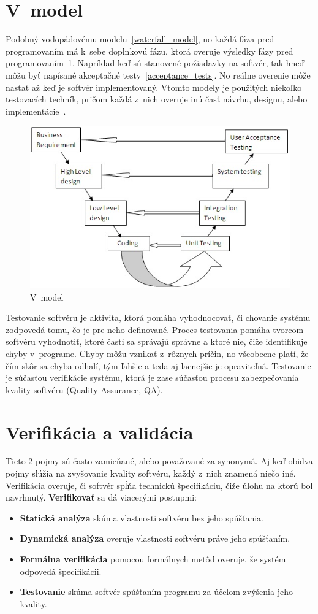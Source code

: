 \section*{V~model}
\label{v_model}
Podobný vodopádovému modelu~\ref{waterfall_model}, no každá fáza pred programovaním má k~sebe doplnkovú fázu, ktorá overuje výsledky fázy pred programovaním~\ref{v_model_fig}.
Napríklad keď sú stanovené požiadavky na softvér, tak hneď môžu byť napísané akceptačné testy~\ref{acceptance_tests}.
No reálne overenie môže nastať až keď je softvér implementovaný.
Vtomto modely je použitých niekoľko testovacích techník, pričom každá z~nich overuje inú časť návrhu, designu, alebo implementácie~\cite{Patton}.
\begin{figure}[H]
\centering
\includegraphics[width=0.65\linewidth]{obrazky/v_model.png}
\caption{V~model~\cite{models}}
\label{v_model_fig}
\end{figure}

Testovanie softvéru je aktivita, ktorá pomáha vyhodnocovať, či chovanie systému zodpovedá tomu, čo je pre neho definované.
Proces testovania pomáha tvorcom softvéru vyhodnotiť, ktoré časti sa správajú správne a ktoré nie, čiže identifikuje chyby v~programe.
Chyby môžu vznikať z~rôznych príčin, no všeobecne platí, že čím skôr sa chyba odhalí, tým ľahšie a teda aj lacnejšie je opraviteľná.
Testovanie je súčasťou verifikácie systému, ktorá je zase súčasťou procesu zabezpečovania kvality softvéru (Quality Assurance, QA).~\cite{hornicky}

\section{Verifikácia a validácia}
Tieto 2 pojmy sú často zamieňané, alebo považované za synonymá.
Aj keď obidva pojmy slúžia na zvyšovanie kvality softvéru, každý z~nich znamená niečo iné.
Verifikácia overuje, či softvér spĺňa technickú špecifikáciu, čiže úlohu na ktorú bol navrhnutý.
\textbf{Verifikovať} sa dá viacerými postupmi:
\begin{itemize}
	\item \textbf{Statická analýza} skúma vlastnosti softvéru bez jeho spúšťania.
	\item \textbf{Dynamická analýza} overuje vlastnosti softvéru práve jeho spúšťaním.
	\item \textbf{Formálna verifikácia} pomocou formálnych metôd overuje, že systém odpovedá špecifikácii.
	\item \textbf{Testovanie} skúma softvér spúšťaním programu za účelom zvýšenia jeho kvality.
\end{itemize}

